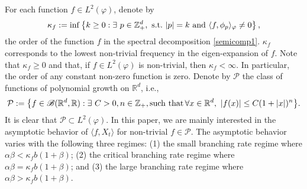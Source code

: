 \documentclass[12pt,a4paper]{amsart}
\theoremstyle{plain}
\theoremstyle{definition}
\numberwithin{equation}{section}
\begin{document}
    For each function $f\in L^2(\varphi)$, denote by
\begin{equation}
    \kappa_f
    :=\inf \left \{k\geq 0: \exists ~ p\in \mathbb Z_+^d ,{\rm ~s.t.~}|p|=k {\rm ~and~}  \langle f, \phi_p \rangle_{\varphi}\neq 0\right \},
\end{equation}
    the order of the function $f$ in the spectral decomposition \eqref{semicomp1}.
$\kappa_f$ corresponds to the lowest non-trivial frequency in the eigen-expansion of $f$.
    Note that $ \kappa_f\geq 0$ and that, if $f\in L^2(\varphi)$ is non-trivial, then $\kappa_f<\infty$.
    In particular, the order of any constant non-zero function is zero.
    Denote by $\mathcal P$ the class of functions of polynomial growth on $\mathbb R^d$, i.e.,
\begin{equation}
\label{eq: polynomial growth function}
    \mathcal{P}
    :=\big \{f\in \mathscr B(\mathbb R^d, \mathbb R):\exists~ C>0, n \in \mathbb Z_+, {\rm such  \, \, that \, } \forall x\in \mathbb R^d,~ |f(x)|\leq C(1+|x|)^n\big\}.
\end{equation}
    It is clear that $\mathcal{P} \subset L^2(\varphi)$.
    In this paper, we are mainly interested in the asymptotic behavior of $\langle f, X_t\rangle$
    for non-trivial $f\in \mathcal P$.
    The asymptotic behavior varies with the following three regimes:
(1) the small branching rate regime where $\alpha\beta<\kappa_fb(1+\beta)$; (2) the 
critical branching rate regime where $\alpha\beta=\kappa_fb(1+\beta)$; and
(3) the large branching rate regime where $\alpha\beta>\kappa_fb(1+\beta)$.
\end{document}
